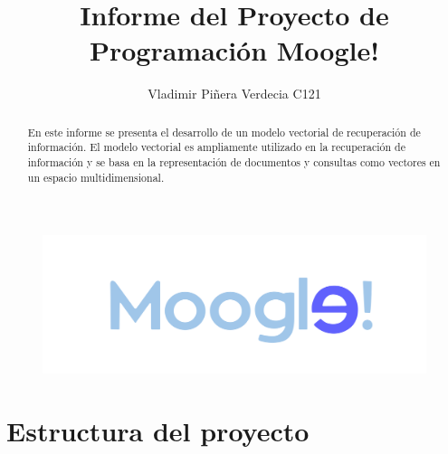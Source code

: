 \documentclass{article}
\title{Informe del Proyecto de Programación Moogle!}
\author{Vladimir Piñera Verdecia C121}
\begin{document}
\begin{figure}
\centering
\includegraphics[width=1\linewidth]{logo.png}
\end{figure}

\maketitle

\begin{abstract}
En este informe se presenta el desarrollo de un modelo vectorial de recuperación de información. El modelo vectorial es ampliamente utilizado en la recuperación de información y se basa en la representación de documentos y consultas como vectores en un espacio multidimensional. 
\end{abstract}

\section{Estructura del proyecto}
\end{document}
